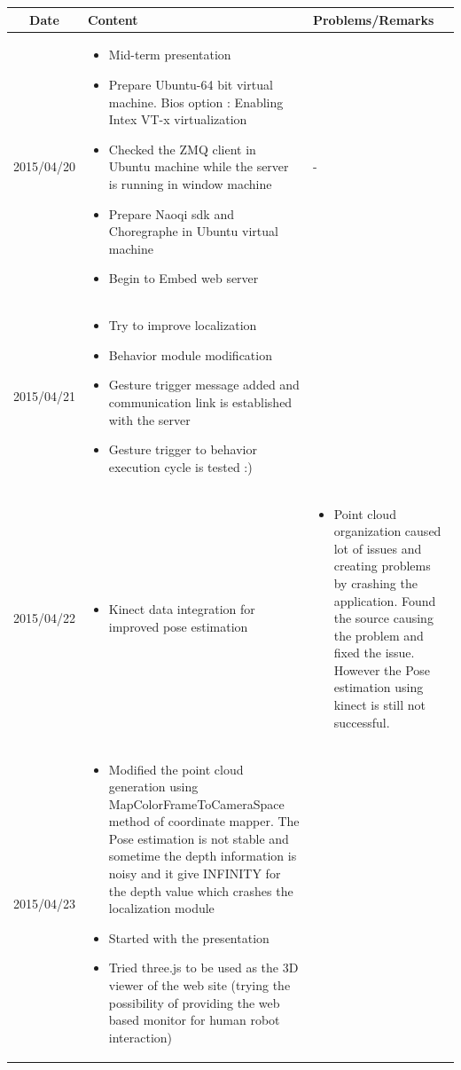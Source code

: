 \documentclass[11pt]{article} %
\begin{document}
\begin{center}
    \begin{longtable}{ | c | p{6cm} | p{5cm} |}
    \hline
    Date & Content & Problems/Remarks \\ 
    \endhead
    \hline    
     2015/04/20         & 
  \begin{itemize}
  \item Mid-term presentation
  \item Prepare Ubuntu-64 bit virtual machine. Bios option : Enabling Intex VT-x virtualization
  \item Checked the ZMQ client in Ubuntu machine while the server is running in window machine
  \item Prepare Naoqi sdk and Choregraphe in Ubuntu virtual machine
  \item Begin to Embed web server
\end{itemize}  
   & - \\
\hline
  										 
 2015/04/21         & 
  \begin{itemize}
  \item Try to improve localization
  \item Behavior module modification
  \item Gesture trigger message added and communication link is established with the server
  \item Gesture trigger to behavior execution cycle is tested :)
\end{itemize}   
& 
 \\
\hline
  										 
  
  2015/04/22        & 
  \begin{itemize}
  \item Kinect data integration for improved pose estimation
  \end{itemize}   
  										 & 
\begin{itemize}
  \item Point cloud organization caused lot of issues and creating problems by crashing the application. Found the source causing the problem and fixed the issue. However the Pose estimation using kinect is still not successful.
  \end{itemize}  
  										 \\
  \hline
  
  2015/04/23         & 
  \begin{itemize}
  \item Modified the point cloud generation using MapColorFrameToCameraSpace method of coordinate mapper. The Pose estimation is not stable and sometime the depth information is noisy and it give INFINITY for the depth value which crashes the localization module
  \item Started with the presentation
  \item Tried three.js to be used as the 3D viewer of the web site (trying the possibility of providing the web based monitor for human robot interaction)
\end{itemize}   
  & 
\\  										 \hline


\end{longtable}
\end{center}
\end{document}
